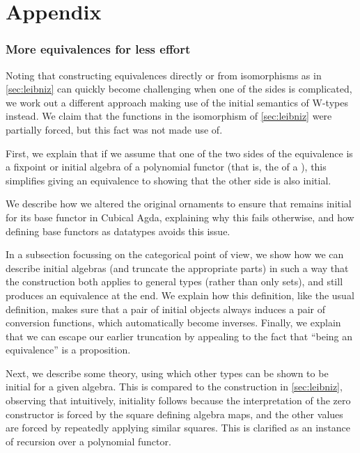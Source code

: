 \documentclass{article}
\theoremstyle{plain}%
\theoremstyle{definition}
\begin{document}
\printbibliography

\part{Appendix}
\appendix



\section{More equivalences for less effort}\label{sec:userfriendly}
Noting that constructing equivalences directly or from isomorphisms as in \autoref{sec:leibniz} can quickly become challenging when one of the sides is complicated, we work out a different approach making use of the initial semantics of W-types instead. We claim that the functions in the isomorphism of \autoref{sec:leibniz} were partially forced, but this fact was not made use of.

First, we explain that if we assume that one of the two sides of the equivalence is a fixpoint or initial algebra of a polynomial functor (that is, the  of a ), this simplifies giving an equivalence to showing that the other side is also initial.

We describe how we altered the original ornaments \cite{progorn} to ensure that  remains initial for its base functor in Cubical Agda, explaining why this fails otherwise, and how defining base functors as datatypes avoids this issue.

In a subsection focussing on the categorical point of view, we show how we can describe initial algebras (and truncate the appropriate parts) in such a way that the construction both applies to general types (rather than only sets), and still produces an equivalence at the end. We explain how this definition, like the usual definition, makes sure that a pair of initial objects always induces a pair of conversion functions, which automatically become inverses. Finally, we explain that we can escape our earlier truncation by appealing to the fact that ``being an equivalence'' is a proposition.

Next, we describe some theory, using which other types can be shown to be initial for a given algebra. This is compared to the construction in \autoref{sec:leibniz}, observing that intuitively, initiality follows because the interpretation of the zero constructor is forced by the square defining algebra maps, and the other values are forced by repeatedly applying similar squares. This is clarified as an instance of recursion over a polynomial functor.
\end{document}
